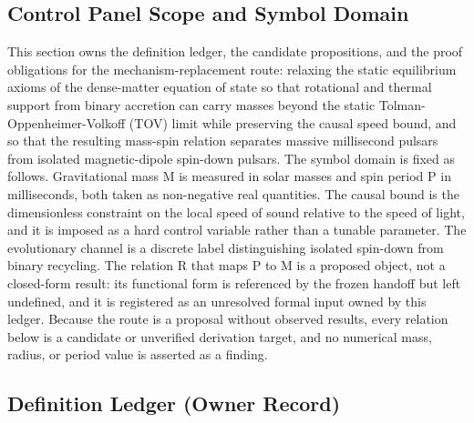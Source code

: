 \documentclass[conference]{IEEEtran}
\begin{document}
\subsection{Control Panel Scope and Symbol Domain}
This section owns the definition ledger, the candidate propositions, and the proof obligations for the mechanism-replacement route: relaxing the static equilibrium axioms of the dense-matter equation of state so that rotational and thermal support from binary accretion can carry masses beyond the static Tolman-Oppenheimer-Volkoff (TOV) limit while preserving the causal speed bound, and so that the resulting mass-spin relation separates massive millisecond pulsars from isolated magnetic-dipole spin-down pulsars. The symbol domain is fixed as follows. Gravitational mass M is measured in solar masses and spin period P in milliseconds, both taken as non-negative real quantities. The causal bound is the dimensionless constraint on the local speed of sound relative to the speed of light, and it is imposed as a hard control variable rather than a tunable parameter. The evolutionary channel is a discrete label distinguishing isolated spin-down from binary recycling. The relation R that maps P to M is a proposed object, not a closed-form result: its functional form is referenced by the frozen handoff but left undefined, and it is registered as an unresolved formal input owned by this ledger. Because the route is a proposal without observed results, every relation below is a candidate or unverified derivation target, and no numerical mass, radius, or period value is asserted as a finding.

\subsection{Definition Ledger (Owner Record)}
\end{document}
